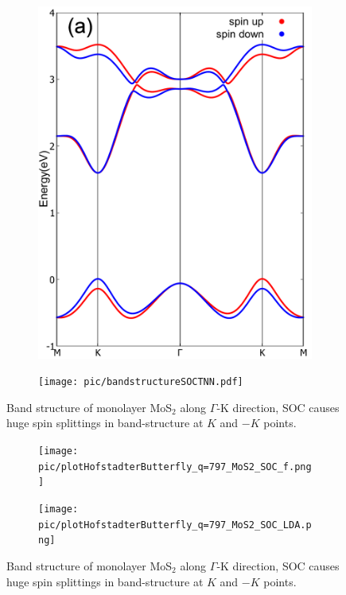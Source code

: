 \documentclass{report}
\begin{document}


\begin{figure}[htb]
	\begin{subfigure}[b]{0.495\textwidth}
		\centering
		\includegraphics[width=\linewidth]{pic/bandstructureSOC.pdf}
	\end{subfigure}
	\begin{subfigure}[b]{0.495\textwidth}
		\centering
		\texttt{[image: pic/bandstructureSOCTNN.pdf]}
	\end{subfigure}
	\caption[Banstructure with SOC.]{Band structure of monolayer MoS$_{2}$ along $\Gamma$-K direction, SOC causes huge spin splittings in band-structure at $K$ and $-K$ points.}
\end{figure}
\begin{figure}[htb]
	\begin{subfigure}[b]{0.495\textwidth}
		\centering
		\texttt{[image: pic/plotHofstadterButterfly\_q=797\_MoS2\_SOC\_f.png]}
	\end{subfigure}
	\begin{subfigure}[b]{0.495\textwidth}
		\centering
		\texttt{[image: pic/plotHofstadterButterfly\_q=797\_MoS2\_SOC\_LDA.png]}
	\end{subfigure}
	\caption[Banstructure with SOC.]{Band structure of monolayer MoS$_{2}$ along $\Gamma$-K direction, SOC causes huge spin splittings in band-structure at $K$ and $-K$ points.}
\end{figure}
\end{document}
